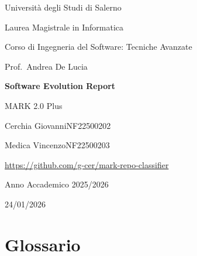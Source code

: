 \documentclass[11pt,a4paper]{article}
\newcommand{\projectName}{MARK 2.0 Plus}
\newcommand{\courseName}{Ingegneria del Software: Tecniche Avanzate}
\newcommand{\courseTeacher}{Prof.\ Andrea De Lucia}
\newcommand{\degreeName}{Laurea Magistrale in Informatica}
\newcommand{\universityName}{Universit\`a degli Studi di Salerno}
\newcommand{\academicYear}{2025/2026}
\newcommand{\repoUrl}{https://github.com/g-cer/mark-repo-classifier}
\newcommand{\authorOne}{Cerchia Giovanni}
\newcommand{\authorOneId}{NF22500202}
\newcommand{\authorTwo}{Medica Vincenzo}
\newcommand{\authorTwoId}{NF22500203}
\newcommand{\docDate}{24/01/2026}
\begin{document}
\begin{titlepage}
  \centering
  \thispagestyle{empty}

  {\large \universityName\par}
  \vspace{0.4em}
  {\large \degreeName\par}

  \vspace{1.6cm}

  {\large Corso di \courseName\par}
  \vspace{0.3em}
  {\large \courseTeacher\par}

  \vspace{4.5cm}

  {\LARGE\bfseries Software Evolution Report\par}
  \vspace{0.8em}
  {\Large \projectName\par}

  \vspace{4.5cm}

  {\large \authorOne\quad\quad\authorOneId\par}
  \vspace{0.3em}
  {\large \authorTwo\quad\quad\authorTwoId\par}

  \vspace{1.2cm}

  {\small \url{\repoUrl}\par}

  \vfill

  {\large Anno Accademico \academicYear\par}
  \vspace{0.4em}
  {\large \docDate\par}
\end{titlepage}

\tableofcontents
\clearpage

\section*{Glossario}
\end{document}
